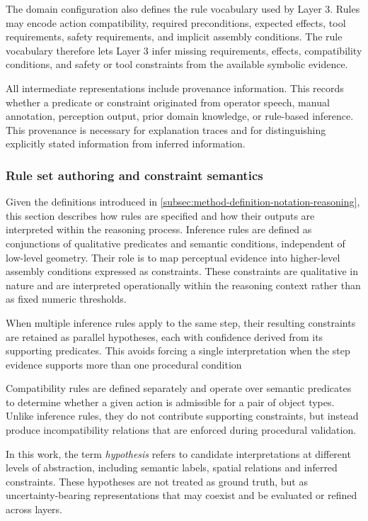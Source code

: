 The domain configuration also defines the rule vocabulary used by Layer 3. Rules may encode action compatibility, required preconditions, expected effects, tool requirements, safety requirements, and implicit assembly conditions. The rule vocabulary therefore lets Layer 3 infer missing requirements, effects, compatibility conditions, and safety or tool constraints from the available symbolic evidence.

All intermediate representations include provenance information. This records whether a predicate or constraint originated from operator speech, manual annotation, perception output, prior domain knowledge, or rule-based inference. This provenance is necessary for explanation traces and for distinguishing explicitly stated information from inferred information.


\subsubsection{Rule set authoring and constraint semantics}
\label{sec:rule-authoring}

Given the definitions introduced in \cref{subsec:method-definition-notation-reasoning}, this section describes how rules are specified and how their outputs are interpreted within the reasoning process.
Inference rules are defined as conjunctions of qualitative predicates and semantic conditions, independent of low-level geometry. Their role is to map perceptual evidence into higher-level assembly conditions expressed as constraints. These constraints are qualitative in nature and are interpreted operationally within the reasoning context rather than as fixed numeric thresholds.

When multiple inference rules apply to the same step, their resulting constraints are retained as parallel hypotheses, each with confidence derived from its supporting predicates. This avoids forcing a single interpretation when the step evidence supports more than one procedural condition

Compatibility rules are defined separately and operate over semantic predicates to determine whether a given action is admissible for a pair of object types. Unlike inference rules, they do not contribute supporting constraints, but instead produce incompatibility relations that are enforced during procedural validation.

In this work, the term \textit{hypothesis} refers to candidate interpretations at different levels of abstraction, including semantic labels, spatial relations and inferred constraints. These hypotheses are not treated as ground truth, but as uncertainty-bearing representations that may coexist and be evaluated or refined across layers.


